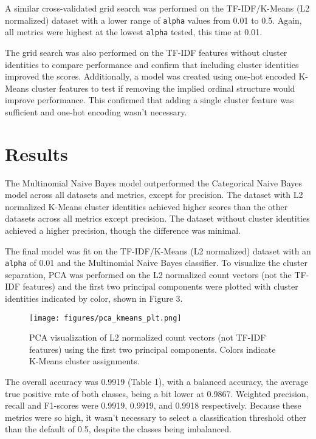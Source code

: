 \documentclass{article}      %
\begin{document}
A similar cross-validated grid search was performed on the TF-IDF/K-Means (L2 normalized) dataset with a lower range of \texttt{alpha} values from 0.01 to 0.5. Again, all metrics were highest at the lowest \texttt{alpha} tested, this time at 0.01.

The grid search was also performed on the TF-IDF features without cluster identities to compare performance and confirm that including cluster identities improved the scores. Additionally, a model was created using one-hot encoded K-Means cluster features to test if removing the implied ordinal structure would improve performance. This confirmed that adding a single cluster feature was sufficient and one-hot encoding wasn't necessary.

\section{Results}

The Multinomial Naive Bayes model outperformed the Categorical Naive Bayes model across all datasets and metrics, except for precision. The dataset with L2 normalized K-Means cluster identities achieved higher scores than the other datasets across all metrics except precision. The dataset without cluster identities achieved a higher precision, though the difference was minimal.

The final model was fit on the TF-IDF/K-Means (L2 normalized) dataset with an \texttt{alpha} of 0.01 and the Multinomial Naive Bayes classifier. To visualize the cluster separation, PCA was performed on the L2 normalized count vectors (not the TF-IDF features) and the first two principal components were plotted with cluster identities indicated by color, shown in Figure 3.

\begin{figure}[!h]
	\centering
	\texttt{[image: figures/pca\_kmeans\_plt.png]}
	\caption{PCA visualization of L2 normalized count vectors (not TF-IDF features) using the first two principal components. Colors indicate K-Means cluster assignments.}
	\label{fig:pca_kmeans}
\end{figure}

The overall accuracy was 0.9919 (Table 1), with a balanced accuracy, the average true positive rate of both classes, being a bit lower at 0.9867. Weighted precision, recall and F1-scores were 0.9919, 0.9919, and 0.9918 respectively. Because these metrics were so high, it wasn't necessary to select a classification threshold other than the default of 0.5, despite the classes being imbalanced. 
\end{document}
